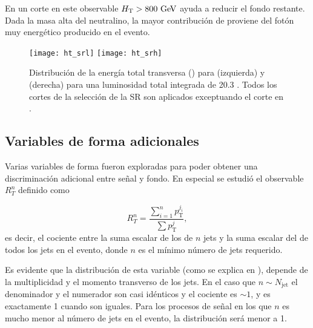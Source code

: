 En {\SRH} un corte en este observable $\HT>800\gev$ ayuda a reducir el fondo restante.
Dada la masa alta del neutralino, la mayor contribución de {\HT} proviene
del fotón muy energético producido en el evento.


\begin{figure}[!htbp]
  \centering

  \texttt{[image: ht\_srl]}
  \texttt{[image: ht\_srh]}

  \caption{Distribución de la energía total transversa (\HT) para {\SRL} (izquierda)
    y {\SRH} (derecha) para una luminosidad total integrada de 20.3 \ifb. Todos los cortes de la selección
  de la SR son aplicados exceptuando el corte en {\HT}.}
  \label{fig:opt_ht}
\end{figure}



\subsection{Variables de forma adicionales}\label{sec:shape_vars}

Varias variables de forma fueron exploradas para poder obtener
una discriminación adicional entre señal y fondo. En especial se estudió el
observable $R_T^n$ definido como

\begin{equation}\label{eq:rt_formula}
  R_{T}^{n} = \frac{\sum_{i=1}^{n}p_\mathrm{T}^{j_i}}{\sum p_\mathrm{T}^{j}},
\end{equation}
%
es decir, el cociente entre la suma escalar de los {\pt} de $n$ jets y la suma
escalar del {\pt} de todos los jets en el evento, donde $n$ es el mínimo número
de jets requerido.

Es evidente que la distribución de esta variable (como se explica en
\cite{PhysRevD.84.055010}), depende de la multiplicidad y el momento transverso
de los jets. En el caso que $n \sim N_\mathrm{jet}$ el denominador y el
numerador son casi idénticos y el cociente es $\sim 1$, y es exactamente 1
cuando son iguales.
Para los procesos de señal en los que $n$ es mucho menor al número de jets en el
evento, la distribución será menor a 1.



